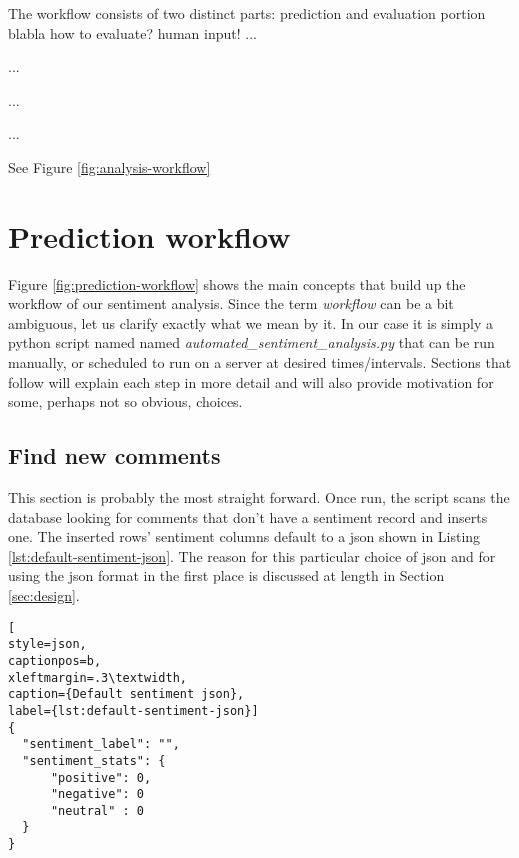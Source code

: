 

The workflow  consists of two distinct parts: prediction and evaluation portion  blabla
how to evaluate? human input! 
...

...

...

...

See Figure \ref{fig:analysis-workflow}




\section{Prediction workflow\label{sec:sentiment-prediction-workflow}}

Figure \ref{fig:prediction-workflow} shows the main concepts that build up the workflow of our sentiment analysis. 
Since the term \textit{workflow} can be a bit ambiguous, let us clarify exactly what we mean by it. In our case it is simply a python script named named \textit{automated\_sentiment\_analysis.py} that can be run manually, or scheduled to run on a server at desired times/intervals. 
Sections that follow will explain each step in more detail and will also provide motivation for some, perhaps not so obvious, choices.



\subsection*{Find new comments\label{sec:find-new-comments}}

This section is probably the most straight forward. Once run, the script scans the database looking for comments that don't have a sentiment record and inserts one. 
The inserted rows' sentiment columns default to a json shown in Listing \ref{lst:default-sentiment-json}. The reason for this particular choice of json and for using the json format in the first place is discussed at length in Section \ref{sec:design}.

\begin{lstlisting}[
style=json,
captionpos=b,
xleftmargin=.3\textwidth,
caption={Default sentiment json},
label={lst:default-sentiment-json}]
{
  "sentiment_label": "",
  "sentiment_stats": {
      "positive": 0,
      "negative": 0
      "neutral" : 0
  }
}
\end{lstlisting}
